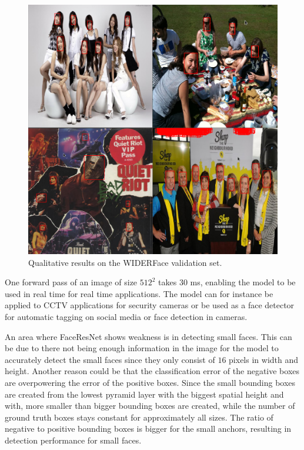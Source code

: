 \documentclass[a4paper,11pt,twoside]{article}
\begin{document}
\begin{figure}[h]
	\centering
  		\includegraphics[scale=0.42]{results1.png}
  	\caption{Qualitative results on the WIDERFace validation set.}\label{faceresults}
\end{figure}

One forward pass of an image of size $512^2$ takes 30 ms, enabling the model to be used in real time for real time applications. The model can for instance be applied to CCTV applications for security cameras or be used as a face detector for automatic tagging on social media or face detection in cameras.

An area where FaceResNet shows weakness is in detecting small faces. This can be due to there not being enough information in the image for the model to accurately detect the small faces since they only consist of $16$ pixels in width and height. Another reason could be that the classification error of the negative boxes are overpowering the error of the positive boxes. Since the small bounding boxes are created from the lowest pyramid layer with the biggest spatial height and with, more smaller than bigger bounding boxes are created, while the number of ground truth boxes stays constant for approximately all sizes. The ratio of negative to positive bounding boxes is bigger for the small anchors, resulting in detection performance for small faces.
\end{document}
